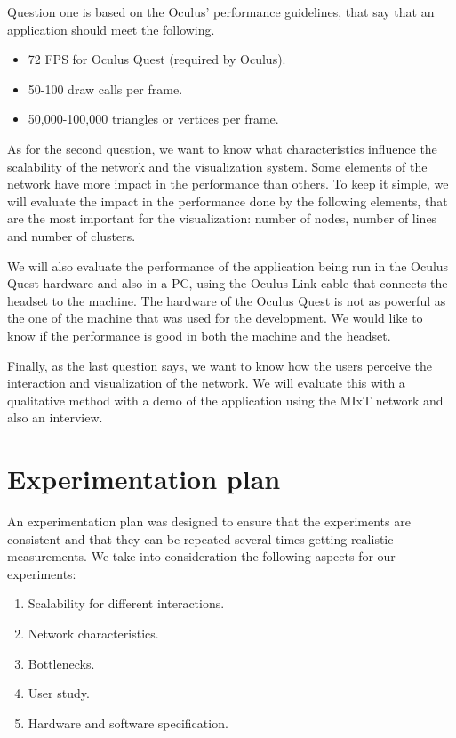 Question one is based on the Oculus' performance guidelines\cite{oculus_performance_baselines}, that say that an application should meet the following.
\begin{itemize}
  \item 72 FPS for Oculus Quest (required by Oculus).
  \item 50-100 draw calls per frame.
  \item 50,000-100,000 triangles or vertices per frame.
\end{itemize}

As for the second question, we want to know what characteristics influence the scalability of the network and the visualization system. Some elements of the network have more impact in the performance than others. To keep it simple, we will evaluate the impact in the performance done by the following elements, that are the most important for the visualization: number of nodes, number of lines and number of clusters.

We will also evaluate the performance of the application being run in the Oculus Quest hardware and also in a PC, using the Oculus Link cable that connects the headset to the machine. The hardware of the Oculus Quest is not as powerful as the one of the machine that was used for the development. We would like to know if the performance is good in both the machine and the headset.

Finally, as the last question says, we want to know how the users perceive the interaction and visualization of the network. We will evaluate this with a qualitative method with a demo of the application using the MIxT network and also an interview.

\section{Experimentation plan}
An experimentation plan was designed to ensure that the experiments are consistent and that they can be repeated several times getting realistic measurements. We take into consideration the following aspects for our experiments:
\begin{enumerate}
  \item Scalability for different interactions.
  \item Network characteristics.
  \item Bottlenecks.
  \item User study.
  \item Hardware and software specification.
\end{enumerate}

